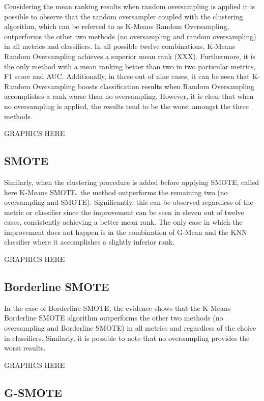 \documentclass[parskip=full]{scrartcl}
\begin{document}
Considering the mean ranking results when random oversampling is applied it is 
possible to observe that the random oversampler coupled with the clustering 
algorithm, which can be referred to as K-Means Random Oversampling, outperforms 
the other two methods (no oversampling and random oversampling) in all metrics 
and classifiers. In all possible twelve combinations, K-Means Random 
Oversampling achieves a superior mean rank (XXX). Furthermore, it is the only 
method with a mean ranking better than two in two particular metrics, F1 score 
and AUC. Additionally, in three out of nine cases, it can be seen that K-Random 
Oversampling boosts classification results when Random Oversampling 
accomplishes a rank worse than no oversampling. However, it is clear that when 
no oversampling is applied, the results tend to be the worst amongst the three 
methods.

GRAPHICS HERE

\subsection{SMOTE}

Similarly, when the clustering procedure is added before applying SMOTE, called 
here K-Means SMOTE, the method outperforms the remaining two (no oversampling 
and SMOTE). Significantly, this can be observed regardless of the metric or 
classifier since the improvement can be seen in eleven out of twelve cases, 
consistently achieving a better mean rank. The only case in which the 
improvement does not happen is in the combination of G-Mean and the KNN 
classifier where it accomplishes a slightly inferior rank. 

GRAPHICS HERE

\subsection{Borderline SMOTE}

In the case of Borderline SMOTE, the evidence shows that the K-Means Borderline 
SMOTE algorithm outperforms the other two methods (no oversampling and 
Borderline SMOTE) in all metrics and regardless of the choice in classifiers. 
Similarly, it is possible to note that no oversampling provides the worst 
results.

GRAPHICS HERE

\subsection{G-SMOTE}
\end{document}
